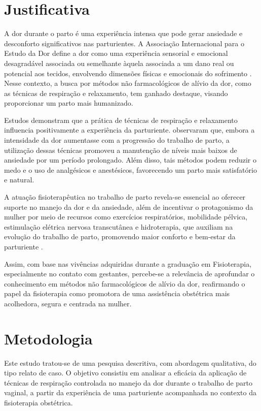 \documentclass[openright]{tex/estilos/normas-utf-tex}
\begin{document}
\chapter{Justificativa}
\label{chap:justificativa}

A dor durante o parto é uma experiência intensa que pode gerar ansiedade e desconforto significativos nas parturientes. A Associação Internacional para o Estudo da Dor define a dor como uma experiência sensorial e emocional desagradável associada ou semelhante àquela associada a um dano real ou potencial aos tecidos, envolvendo dimensões físicas e emocionais do sofrimento \cite{raja2020}. Nesse contexto, a busca por métodos não farmacológicos de alívio da dor, como as técnicas de respiração e relaxamento, tem ganhado destaque, visando proporcionar um parto mais humanizado.

Estudos demonstram que a prática de técnicas de respiração e relaxamento influencia positivamente a experiência da parturiente.  observaram que, embora a intensidade da dor aumentasse com a progressão do trabalho de parto, a utilização dessas técnicas promoveu a manutenção de níveis mais baixos de ansiedade por um período prolongado. Além disso, tais métodos podem reduzir o medo e o uso de analgésicos e anestésicos, favorecendo um parto mais satisfatório e natural.

A atuação fisioterapêutica no trabalho de parto revela-se essencial ao oferecer suporte no manejo da dor e da ansiedade, além de incentivar o protagonismo da mulher por meio de recursos como exercícios respiratórios, mobilidade pélvica, estimulação elétrica nervosa transcutânea e hidroterapia, que auxiliam na evolução do trabalho de parto, promovendo maior conforto e bem-estar da parturiente \cite{sousa2021}.

Assim, com base nas vivências adquiridas durante a graduação em Fisioterapia, especialmente no contato com gestantes, percebe-se a relevância de aprofundar o conhecimento em métodos não farmacológicos de alívio da dor, reafirmando o papel da fisioterapia como promotora de uma assistência obstétrica mais acolhedora, segura e centrada na mulher.

\chapter{Metodologia}
\label{chap:metodologia}

Este estudo tratou-se de uma pesquisa descritiva, com abordagem qualitativa, do tipo relato de caso. O objetivo consistiu em analisar a eficácia da aplicação de técnicas de respiração controlada no manejo da dor durante o trabalho de parto vaginal, a partir da experiência de uma parturiente acompanhada no contexto da fisioterapia obstétrica.
\end{document}
